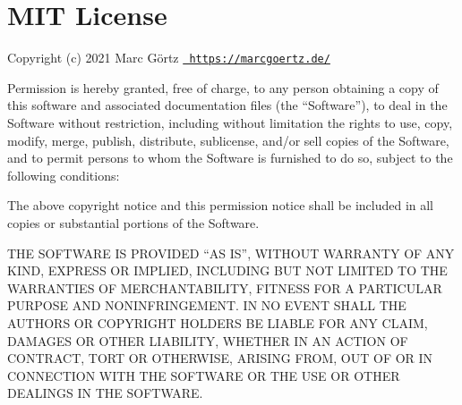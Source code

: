 \chapter{MIT License}
\hypertarget{md_node__modules_2postcss-opacity-percentage_2LICENSE}{}\label{md_node__modules_2postcss-opacity-percentage_2LICENSE}
\label{md_node__modules_2postcss-opacity-percentage_2LICENSE_autotoc_md21555}%
%
 Copyright (c) 2021 Marc Görtz \href{https://marcgoertz.de/}{\texttt{ https\+://marcgoertz.\+de/}}

Permission is hereby granted, free of charge, to any person obtaining a copy of this software and associated documentation files (the “\+Software”), to deal in the Software without restriction, including without limitation the rights to use, copy, modify, merge, publish, distribute, sublicense, and/or sell copies of the Software, and to permit persons to whom the Software is furnished to do so, subject to the following conditions\+:

The above copyright notice and this permission notice shall be included in all copies or substantial portions of the Software.

THE SOFTWARE IS PROVIDED “\+AS IS”, WITHOUT WARRANTY OF ANY KIND, EXPRESS OR IMPLIED, INCLUDING BUT NOT LIMITED TO THE WARRANTIES OF MERCHANTABILITY, FITNESS FOR A PARTICULAR PURPOSE AND NONINFRINGEMENT. IN NO EVENT SHALL THE AUTHORS OR COPYRIGHT HOLDERS BE LIABLE FOR ANY CLAIM, DAMAGES OR OTHER LIABILITY, WHETHER IN AN ACTION OF CONTRACT, TORT OR OTHERWISE, ARISING FROM, OUT OF OR IN CONNECTION WITH THE SOFTWARE OR THE USE OR OTHER DEALINGS IN THE SOFTWARE. 